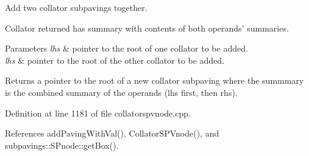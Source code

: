 \-Add two collator subpavings together. 

\-Collator returned has summary with contents of both operands' summaries.


\begin{DoxyParams}{\-Parameters}
{\em lhs} & pointer to the root of one collator to be added. \\
\hline
{\em lhs} & pointer to the root of the other collator to be added. \\
\hline
\end{DoxyParams}
\begin{DoxyReturn}{\-Returns}
a pointer to the root of a new collator subpaving where the summmary is the combined summary of the operands (lhs first, then rhs). 
\end{DoxyReturn}


\-Definition at line 1181 of file collatorspvnode.\-cpp.



\-References add\-Paving\-With\-Val(), \-Collator\-S\-P\-Vnode(), and subpavings\-::\-S\-Pnode\-::get\-Box().


